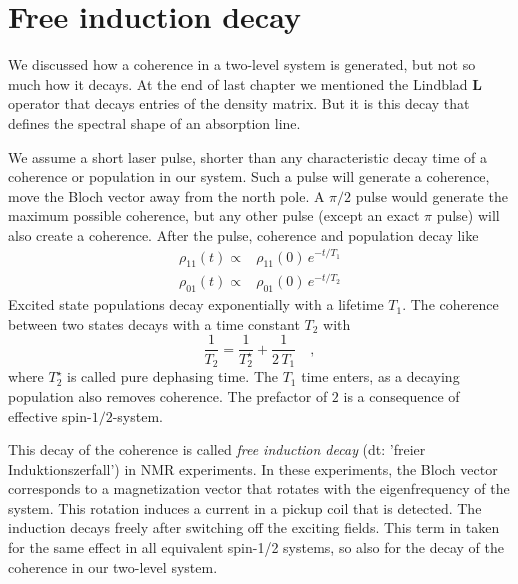 \section{Free induction decay}

We discussed how a coherence in a two-level system is generated, but not so much how it decays. At the end of last chapter we mentioned the Lindblad $\boldsymbol{L}$ operator that decays entries of the density matrix. But it is this decay that defines the spectral shape of an absorption line.

We assume a short laser pulse, shorter than any characteristic decay time of a coherence or population in our system. Such a pulse will generate a coherence, move the Bloch vector away from the north pole. A $\pi/2$ pulse would generate the maximum possible coherence, but any other pulse (except an exact $\pi$ pulse) will also create a coherence. After the pulse,  coherence  and population decay like
\begin{align}
 \rho_{11}(t) \propto & \rho_{11}(0)  \, e^{- t / T_1} \\
 \rho_{01}(t) \propto & \rho_{01}(0)  \, e^{- t / T_2} 
\end{align}
Excited state populations decay exponentially with a lifetime $T_1$. The coherence between two states decays with a time constant $T_2$ with
\begin{equation}
    \frac{1}{T_2} = \frac{1}{T_2^\star} + \frac{1}{2 \, T_1} \quad ,
\end{equation}
where $T_2^\star$ is called pure dephasing time. The $T_1$ time enters, as a decaying population also removes coherence. The prefactor of $2$ is a consequence of effective spin-$1/2$-system.

This decay of the coherence is called \emph{free induction decay} (dt: 'freier Induktionszerfall') in NMR experiments. In these experiments, the Bloch vector corresponds to a magnetization vector that rotates with the eigenfrequency of the system. This rotation induces a current in a pickup coil that is detected. The induction decays freely after switching off the exciting fields. This term in taken for the same effect in all equivalent spin-1/2 systems, so also for the decay of the coherence in our two-level system.

